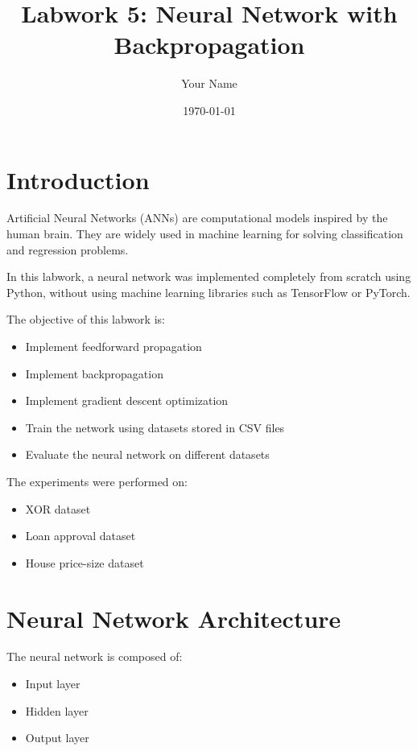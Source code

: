 \documentclass[a4paper,12pt]{article}
\title{Labwork 5: Neural Network with Backpropagation}
\author{Your Name}
\date{\today}
\begin{document}
\maketitle

\tableofcontents

\newpage

\section{Introduction}

Artificial Neural Networks (ANNs) are computational models inspired by the human brain. 
They are widely used in machine learning for solving classification and regression problems.

In this labwork, a neural network was implemented completely from scratch using Python, without using machine learning libraries such as TensorFlow or PyTorch.

The objective of this labwork is:
\begin{itemize}
    \item Implement feedforward propagation
    \item Implement backpropagation
    \item Implement gradient descent optimization
    \item Train the network using datasets stored in CSV files
    \item Evaluate the neural network on different datasets
\end{itemize}

The experiments were performed on:
\begin{itemize}
    \item XOR dataset
    \item Loan approval dataset
    \item House price-size dataset
\end{itemize}

\section{Neural Network Architecture}

The neural network is composed of:
\begin{itemize}
    \item Input layer
    \item Hidden layer
    \item Output layer
\end{itemize}
\end{document}
